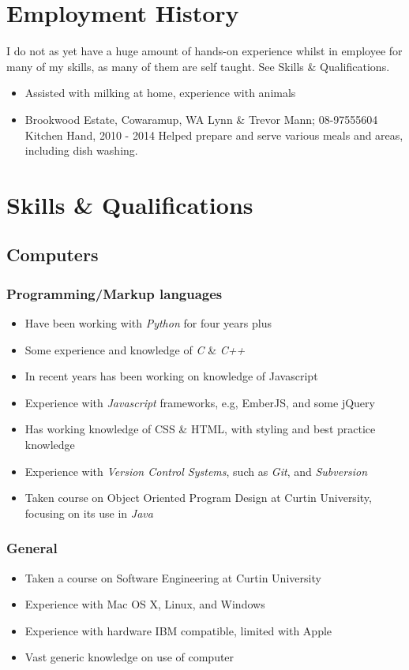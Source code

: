 \documentclass{article}
\begin{document}
\section{Employment History}
  I do not as yet have a huge amount of hands-on experience whilst in employee
  for many of my skills, as many of them are self taught. See Skills \& Qualifications.

  \begin{itemize}
    \item Assisted with milking at home, experience with animals
    \item{
      Brookwood Estate, Cowaramup, WA
      Lynn \& Trevor Mann; 08-97555604
      Kitchen Hand, 2010 - 2014
      Helped prepare and serve various meals and areas, including dish washing.
    }
  \end{itemize}

\section{Skills \& Qualifications}
  \subsection{Computers}
    \subsubsection{Programming/Markup languages}
    \begin{itemize}
      \item Have been working with \emph{Python} for four years plus
      \item Some experience and knowledge of \emph{C} \& \emph{C++}
      \item In recent years has been working on knowledge of Javascript
      \item Experience with \emph{Javascript} frameworks, e.g, EmberJS, and some jQuery
      \item Has working knowledge of CSS \& HTML, with styling and best practice knowledge
      \item Experience with \emph{Version Control Systems}, such as \emph{Git}, and \emph{Subversion}
      \item Taken course on Object Oriented Program Design at Curtin University, focusing on its use in \emph{Java}
    \end{itemize}

    \subsubsection{General}
      \begin{itemize}
        \item Taken a course on Software Engineering at Curtin University
        \item Experience with Mac OS X, Linux, and Windows
        \item Experience with hardware IBM compatible, limited with Apple
        \item Vast generic knowledge on use of computer
      \end{itemize}
\end{document}
